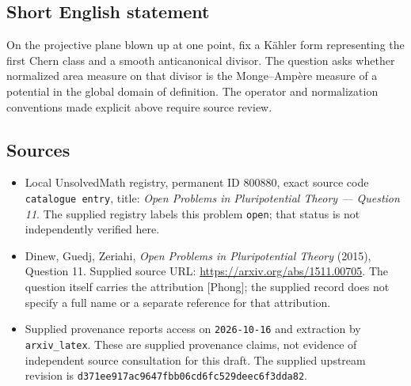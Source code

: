 \documentclass[11pt]{article}
\begin{document}
\subsection{Short English statement}
On the projective plane blown up at one point, fix a K\"ahler form representing the first Chern class and a smooth anticanonical divisor. The question asks whether normalized area measure on that divisor is the Monge--Amp\`ere measure of a potential in the global domain of definition. The operator and normalization conventions made explicit above require source review.
\subsection{Sources}
\begin{itemize}
\item Local UnsolvedMath registry, permanent ID \(800880\), exact source code \texttt{catalogue entry}, title: \emph{Open Problems in Pluripotential Theory --- Question 11}. The supplied registry labels this problem \texttt{open}; that status is not independently verified here.
\item Dinew, Guedj, Zeriahi, \emph{Open Problems in Pluripotential Theory} (2015), Question 11. Supplied source URL: \url{https://arxiv.org/abs/1511.00705}. The question itself carries the attribution \textnormal{[Phong]}; the supplied record does not specify a full name or a separate reference for that attribution.
\item Supplied provenance reports access on \texttt{2026-10-16} and extraction by \texttt{arxiv\_latex}. These are supplied provenance claims, not evidence of independent source consultation for this draft. The supplied upstream revision is \texttt{d371ee917ac9647fbb06cd6fc529deec6f3dda82}.
\end{itemize}
\end{document}

